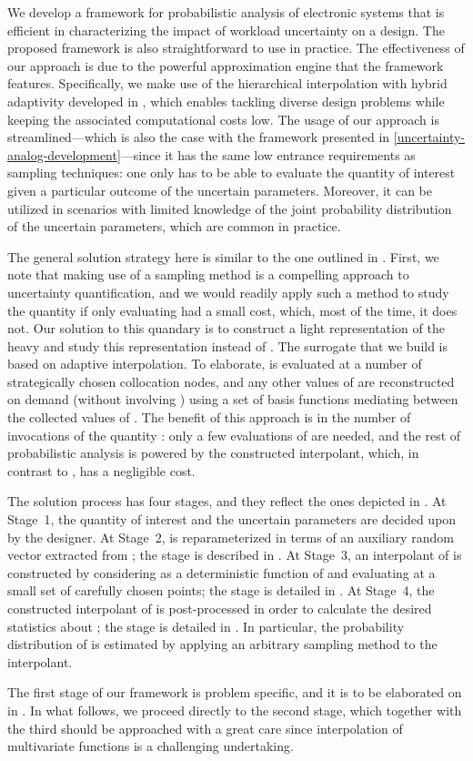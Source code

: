 We develop a framework for probabilistic analysis of electronic systems that is
efficient in characterizing the impact of workload uncertainty on a design. The
proposed framework is also straightforward to use in practice. The effectiveness
of our approach is due to the powerful approximation engine that the framework
features. Specifically, we make use of the hierarchical interpolation with
hybrid adaptivity developed in \cite{klimke2006, ma2009, jakeman2012}, which
enables tackling diverse design problems while keeping the associated
computational costs low. The usage of our approach is streamlined---which is
also the case with the framework presented in
\cref{uncertainty-analog-development}---since it has the same low entrance
requirements as sampling techniques: one only has to be able to evaluate the
quantity of interest given a particular outcome of the uncertain parameters.
Moreover, it can be utilized in scenarios with limited knowledge of the joint
probability distribution of the uncertain parameters, which are common in
practice.

The general solution strategy here is similar to the one outlined in
. First, we note that making use of a sampling method is a
compelling approach to uncertainty quantification, and we would readily apply
such a method to study the quantity \g if only evaluating \g had a small cost,
which, most of the time, it does not. Our solution to this quandary is to
construct a light representation of the heavy \g and study this representation
instead of \g. The surrogate that we build is based on adaptive interpolation.
To elaborate, \g is evaluated at a number of strategically chosen collocation
nodes, and any other values of \g are reconstructed on demand (without involving
\g) using a set of basis functions mediating between the collected values of \g.
The benefit of this approach is in the number of invocations of the quantity \g:
only a few evaluations of \g are needed, and the rest of probabilistic analysis
is powered by the constructed interpolant, which, in contrast to \g, has a
negligible cost.

The solution process has four stages, and they reflect the ones depicted in
. At Stage~1, the quantity of interest \g and the uncertain
parameters \vu are decided upon by the designer. At Stage~2, \g is
reparameterized in terms of an auxiliary random vector \vz extracted from \vu;
the stage is described in . At Stage~3, an
interpolant of \g is constructed by considering \g as a deterministic function
of \vz and evaluating \g at a small set of carefully chosen points; the stage is
detailed in . At Stage~4, the constructed interpolant
of \g is post-processed in order to calculate the desired statistics about \g;
the stage is detailed in . In particular, the probability
distribution of \g is estimated by applying an arbitrary sampling method to the
interpolant.

The first stage of our framework is problem specific, and it is to be elaborated
on in . In what follows, we proceed directly to the
second stage, which together with the third should be approached with a great
care since interpolation of multivariate functions is a challenging undertaking.
